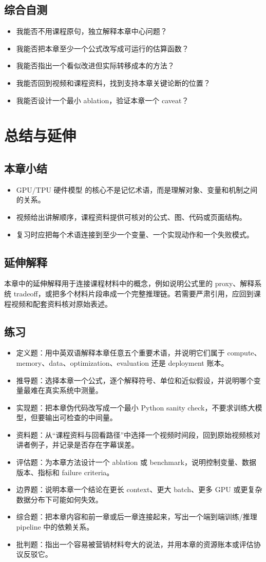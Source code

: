 \documentclass[a4paper]{article}
\begin{document}
\subsection{综合自测}
\begin{itemize}
\item 我能否不用课程原句，独立解释本章中心问题？
\item 我能否把本章至少一个公式改写成可运行的估算函数？
\item 我能否指出一个看似改进但实际转移成本的方法？
\item 我能否回到视频和课程资料，找到支持本章关键论断的位置？
\item 我能否设计一个最小 ablation，验证本章一个 caveat？
\end{itemize}
\section{总结与延伸}
\subsection{本章小结}
\begin{itemize}
\item GPU/TPU 硬件模型 的核心不是记忆术语，而是理解对象、变量和机制之间的关系。
\item 视频给出讲解顺序，课程资料提供可核对的公式、图、代码或页面结构。
\item 复习时应把每个术语连接到至少一个变量、一个实现动作和一个失败模式。
\end{itemize}
\subsection{延伸解释}
本章中的延伸解释用于连接课程材料中的概念，例如说明公式里的 proxy、解释系统 tradeoff，或把多个材料片段串成一个完整推理链。若需要严肃引用，应回到课程视频和配套资料核对原始表述。
\subsection{练习}
\begin{itemize}
\item 定义题：用中英双语解释本章任意五个重要术语，并说明它们属于 compute、memory、data、optimization、evaluation 还是 deployment 账本。
\item 推导题：选择本章一个公式，逐个解释符号、单位和近似假设，并说明哪个变量最难在真实系统中测量。
\item 实现题：把本章伪代码改写成一个最小 Python sanity check，不要求训练大模型，但要输出可检查的中间量。
\item 资料题：从“课程资料与回看路径”中选择一个视频时间段，回到原始视频核对讲者例子，并记录是否存在字幕误差。
\item 评估题：为本章方法设计一个 ablation 或 benchmark，说明控制变量、数据版本、指标和 failure criteria。
\item 边界题：说明本章一个结论在更长 context、更大 batch、更多 GPU 或更复杂数据分布下可能如何失效。
\item 综合题：把本章内容和前一章或后一章连接起来，写出一个端到端训练/推理 pipeline 中的依赖关系。
\item 批判题：指出一个容易被营销材料夸大的说法，并用本章的资源账本或评估协议反驳它。
\end{itemize}
\end{document}
